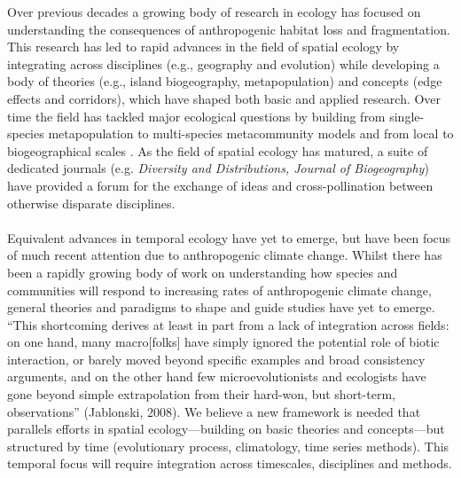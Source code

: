 \documentclass[11pt,a4paper]{article}
\begin{document}
\noindent Over previous decades a growing body of research in ecology has focused on understanding the consequences of anthropogenic habitat loss and fragmentation. This research has led to rapid advances in the field of spatial ecology by integrating across disciplines (e.g., geography and evolution) while developing a body of theories (e.g., island biogeography, metapopulation) and concepts (edge effects and corridors), which have shaped both basic and applied research. Over time the field has tackled major ecological questions by building from single-species metapopulation to multi-species metacommunity models \citep{Pillai2011} and from local to biogeographical scales \citep{bell2001}. As the field of spatial ecology has matured, a suite of dedicated journals  (e.g. \emph{Diversity and Distributions, Journal of Biogeography}) have provided a forum for the exchange of ideas and cross-pollination between otherwise disparate disciplines. \\
\\
Equivalent advances in temporal ecology have yet to emerge, but have been focus of much recent attention due to anthropogenic climate change. Whilst there has been a rapidly growing body of work on understanding how species and communities will respond to increasing rates of anthropogenic climate change, general theories and paradigms to shape and guide studies have yet to emerge. ``This shortcoming derives at least in part from a lack of integration across fields: on one hand, many
macro[folks] have simply ignored the potential role of biotic
interaction, or barely moved beyond specific examples and broad
consistency arguments, and on the other hand few microevolutionists
and ecologists have gone beyond simple extrapolation from
their hard-won, but short-term, observations'' (Jablonski, 2008). We believe a new framework is needed that parallels efforts in spatial ecology---building on basic theories and concepts---but structured by time (evolutionary process, climatology, time series methods). This temporal focus will require integration across timescales, disciplines and methods. \\
\end{document}
